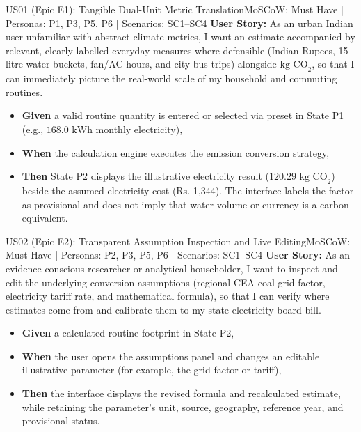 \documentclass[12pt, a4paper]{article}
\begin{document}
\begin{storybox}{US01 (Epic E1): Tangible Dual-Unit Metric Translation}{MoSCoW: Must Have | Personas: P1, P3, P5, P6 | Scenarios: SC1--SC4}
\textbf{User Story:} As an urban Indian user unfamiliar with abstract climate metrics, I want an estimate accompanied by relevant, clearly labelled everyday measures where defensible (Indian Rupees, 15-litre water buckets, fan/AC hours, and city bus trips) alongside $\text{kg CO}_2$, so that I can immediately picture the real-world scale of my household and commuting routines.
\begin{itemize}
    \item \textbf{Given} a valid routine quantity is entered or selected via preset in State P1 (e.g., $168.0\text{ kWh}$ monthly electricity),
    \item \textbf{When} the calculation engine executes the emission conversion strategy,
    \item \textbf{Then} State P2 displays the illustrative electricity result ($120.29\text{ kg CO}_2$) beside the assumed electricity cost (Rs. 1,344). The interface labels the factor as provisional and does not imply that water volume or currency is a carbon equivalent.
\end{itemize}
\end{storybox}

\begin{storybox}{US02 (Epic E2): Transparent Assumption Inspection and Live Editing}{MoSCoW: Must Have | Personas: P2, P3, P5, P6 | Scenarios: SC1--SC4}
\textbf{User Story:} As an evidence-conscious researcher or analytical householder, I want to inspect and edit the underlying conversion assumptions (regional CEA coal-grid factor, electricity tariff rate, and mathematical formula), so that I can verify where estimates come from and calibrate them to my state electricity board bill.
\begin{itemize}
    \item \textbf{Given} a calculated routine footprint in State P2,
    \item \textbf{When} the user opens the assumptions panel and changes an editable illustrative parameter (for example, the grid factor or tariff),
    \item \textbf{Then} the interface displays the revised formula and recalculated estimate, while retaining the parameter's unit, source, geography, reference year, and provisional status.
\end{itemize}
\end{storybox}
\end{document}
